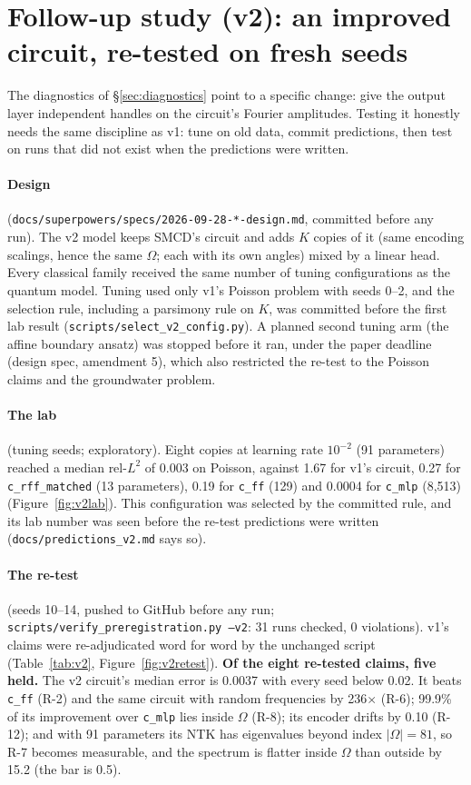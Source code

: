 \section{Follow-up study (v2): an improved circuit, re-tested on fresh seeds}
\label{sec:followup}

The diagnostics of \S\ref{sec:diagnostics} point to a specific change: give the output
layer independent handles on the circuit's Fourier amplitudes. Testing it honestly
needs the same discipline as v1: tune on old data, commit predictions, then test on
runs that did not exist when the predictions were written.

\paragraph{Design} (\texttt{docs/superpowers/specs/2026-09-28-*-design.md}, committed
before any run). The v2 model keeps SMCD's circuit and adds $K$ copies of it (same
encoding scalings, hence the same $\Omega$; each with its own angles) mixed by a linear
head. Every classical family received the same number of tuning configurations as the
quantum model. Tuning used only v1's Poisson problem with seeds 0--2, and the selection
rule, including a parsimony rule on $K$, was committed before the first lab result
(\texttt{scripts/select\_v2\_config.py}). A planned second tuning arm (the affine
boundary ansatz) was stopped before it ran, under the paper deadline (design spec,
amendment 5), which also restricted the re-test to the Poisson claims and the
groundwater problem.

\paragraph{The lab} (tuning seeds; exploratory). Eight copies at learning rate
$10^{-2}$ (91 parameters) reached a median rel-$L^2$ of 0.003 on Poisson, against 1.67
for v1's circuit, 0.27 for \texttt{c\_rff\_matched} (13 parameters), 0.19 for
\texttt{c\_ff} (129) and 0.0004 for \texttt{c\_mlp} (8{,}513)
(Figure~\ref{fig:v2lab}). This configuration was selected by the committed rule, and
its lab number was seen before the re-test predictions were written
(\texttt{docs/predictions\_v2.md} says so).

\paragraph{The re-test} (seeds 10--14, pushed to GitHub before any run;
\texttt{scripts/verify\_preregistration.py --v2}: 31 runs checked, 0 violations).
v1's claims were re-adjudicated word for word by the unchanged script
(Table~\ref{tab:v2}, Figure~\ref{fig:v2retest}). \textbf{Of the eight re-tested
claims, five held.} The v2 circuit's median error is 0.0037 with every seed below
0.02. It beats \texttt{c\_ff} (R-2) and the same circuit with random frequencies by
236$\times$ (R-6); 99.9\% of its improvement over \texttt{c\_mlp} lies inside $\Omega$
(R-8); its encoder drifts by 0.10 (R-12); and with 91 parameters its NTK has
eigenvalues beyond index $|\Omega|=81$, so R-7 becomes measurable, and the spectrum is
flatter inside $\Omega$ than outside by 15.2 (the bar is 0.5).

